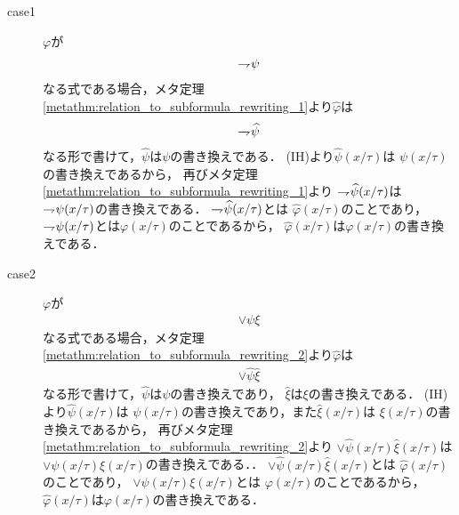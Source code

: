 \begin{metaprf}[第一]
\begin{description}
				\begin{description}
					\item[case1] $\varphi$が
						\begin{align}
							\rightharpoondown\hspace{-0.25em} \psi
						\end{align}
						なる式である場合，メタ定理\ref{metathm:relation_to_subformula_rewriting_1}より$\widehat{\varphi}$は
						\begin{align}
							\rightharpoondown\hspace{-0.25em} \widehat{\psi}
						\end{align}
						なる形で書けて，$\widehat{\psi}$は$\psi$の書き換えである．
						(IH)より$\widehat{\psi}(x/\tau)$は
						$\psi(x/\tau)$の書き換えであるから，
						再びメタ定理\ref{metathm:relation_to_subformula_rewriting_1}より
						$\rightharpoondown\hspace{-0.25em} \widehat{\psi}(x/\tau)$は
						$\rightharpoondown\hspace{-0.25em} \psi(x/\tau)$の書き換えである．
						$\rightharpoondown\hspace{-0.25em} \widehat{\psi}(x/\tau)$とは
						$\widehat{\varphi}(x/\tau)$のことであり，
						$\rightharpoondown\hspace{-0.25em} \psi(x/\tau)$とは$\varphi(x/\tau)$のことであるから，
						$\widehat{\varphi}(x/\tau)$は$\varphi(x/\tau)$の書き換えである．
					
					\item[case2] $\varphi$が
						\begin{align}
							\vee \psi \xi
						\end{align}
						なる式である場合，メタ定理\ref{metathm:relation_to_subformula_rewriting_2}より$\widehat{\varphi}$は
						\begin{align}
							\vee \widehat{\psi} \widehat{\xi}
						\end{align}
						なる形で書けて，$\widehat{\psi}$は$\psi$の書き換えであり，
						$\widehat{\xi}$は$\xi$の書き換えである．
						(IH)より$\widehat{\psi}(x/\tau)$は
						$\psi(x/\tau)$の書き換えであり，また$\widehat{\xi}(x/\tau)$は
						$\xi(x/\tau)$の書き換えであるから，
						再びメタ定理\ref{metathm:relation_to_subformula_rewriting_2}より
						$\vee \widehat{\psi}(x/\tau)\widehat{\xi}(x/\tau)$は
						$\vee \psi(x/\tau)\xi(x/\tau)$の書き換えである．．
						$\vee \widehat{\psi}(x/\tau)\widehat{\xi}(x/\tau)$とは
						$\widehat{\varphi}(x/\tau)$のことであり，
						$\vee \psi(x/\tau)\xi(x/\tau)$とは
						$\varphi(x/\tau)$のことであるから，
						$\widehat{\varphi}(x/\tau)$は$\varphi(x/\tau)$の書き換えである．
					

\end{description}
\end{description}
\end{metaprf}
